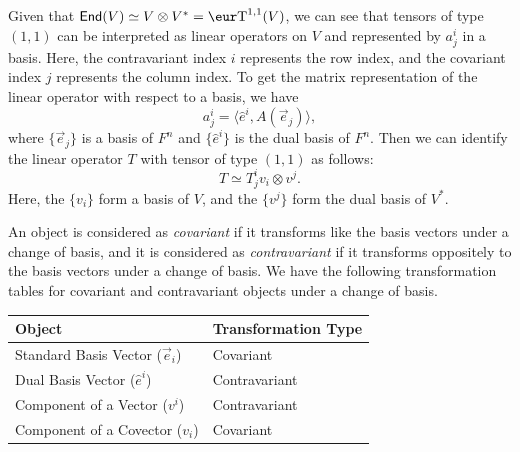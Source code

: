 Given that $\End(V) \simeq V \otimes V^* = \Ten^{1, 1}(V)$, we can see that tensors of type $(1, 1)$ can be interpreted as linear operators on $V$ and represented by $a^i_j$ in a basis. Here, the contravariant index $i$ represents the row index, and the covariant index $j$ represents the column index. To get the matrix representation of the linear operator with respect to a basis, we have
\[
	a^i_j = \langle \hat{e}^i, A(\vec{e}_j) \rangle,
\]
where $\{\vec{e}_j\}$ is a basis of $F^n$ and $\{\hat{e}^i\}$ is the dual basis of $F^n$. Then we can identify the linear operator $T$ with tensor of type $(1, 1)$ as follows:
\[
	T \simeq T^i_j v_i \otimes v^j.
\]
Here, the $\{ v_i \}$ form a basis of $V$, and the $\{ v^j \}$ form the dual basis of $V^*$.

An object is considered as \emph{covariant} if it transforms like the basis vectors under a change of basis, and it is considered as \emph{contravariant} if it transforms oppositely to the basis vectors under a change of basis. We have the following transformation tables for covariant and contravariant objects under a change of basis.
\begin{tabularx}{\textwidth}{X X}
	\toprule
	\bfseries Object                    & \bfseries Transformation Type \\
	\midrule
	Standard Basis Vector ($\vec{e}_i$) & Covariant                     \\
	\midrule
	Dual Basis Vector ($\hat{e}^i$)     & Contravariant                 \\
	\midrule
	Component of a Vector ($v^i$)       & Contravariant                 \\
	\midrule
	Component of a Covector ($v_i$)     & Covariant                     \\
	\bottomrule
\end{tabularx}

